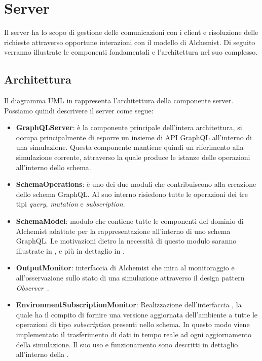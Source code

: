 \section{Server}\label{sec:server}
Il server ha lo scopo di gestione delle comunicazioni con i client e risoluzione delle richieste attraverso opportune interazioni con il modello
di Alchemist. Di seguito verranno illustrate le componenti fondamentali e l'architettura nel suo complesso.
%

\subsection{Architettura}\label{ssec:server-arch}
Il diagramma UML in  rappresenta l'architettura della componente server.
Possiamo quindi descrivere il server come segue:
\begin{itemize}
    \item \textbf{GraphQLServer}: è la componente principale dell'intera architettura, si occupa principalmente di esporre un insieme di API GraphQL all'interno di una simulazione.
        Questa componente mantiene quindi un riferimento alla simulazione corrente, attraverso la quale produce le istanze delle operazioni all'interno dello schema.
    \item \textbf{SchemaOperations}: è uno dei due moduli che contribuiscono alla creazione dello schema GraphQL. Al suo interno risiedono tutte le operazioni dei tre tipi \textit{query},
        \textit{mutation} e \textit{subscription}.
    \item \textbf{SchemaModel}: modulo che contiene tutte le componenti del dominio di Alchemist adattate per la rappresentazione all'interno di uno schema GraphQL. Le motivazioni dietro 
        la necessità di questo modulo saranno illustrate in , e più in dettaglio in .
    \item \textbf{OutputMonitor}: interfaccia di Alchemist che mira al monitoraggio e all'osservazione sullo stato di una simulazione attraverso il design pattern \textit{Observer}~\cite{design-patterns}.
    \item \textbf{EnvironmentSubscriptionMonitor}: Realizzazione dell'interfaccia , la quale ha il compito di fornire una versione aggiornata dell'ambiente a tutte le operazioni
        di tipo \textit{subscription} presenti nello schema. In questo modo viene implementato il trasferimento di dati in tempo reale ad ogni aggiornamento della simulazione. Il suo uso e funzionamento
        sono descritti in dettaglio all'interno della .
\end{itemize}



